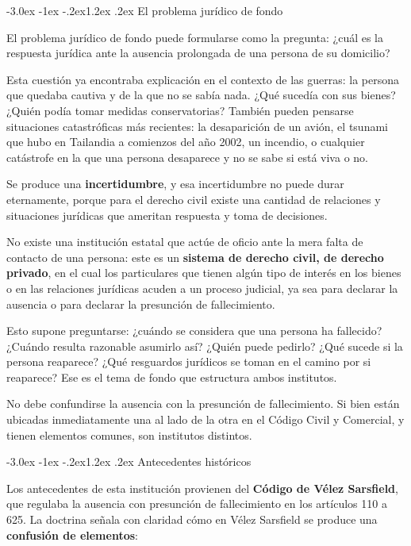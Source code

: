 \documentclass[12pt,oneside]{book}
\makeatletter
\renewcommand\section{\@startsection{section}{1}{\z@}%
  {-3.0ex \@plus -1ex \@minus -.2ex}{1.2ex \@plus .2ex}%
  {\normalfont\large\bfseries\color{acento}}}
\makeatother
\begin{document}
\section{El problema jurídico de fondo}

El problema jurídico de fondo puede formularse como la pregunta: ¿cuál es
la respuesta jurídica ante la ausencia prolongada de una persona de su
domicilio?

Esta cuestión ya encontraba explicación en el contexto de las guerras: la
persona que quedaba cautiva y de la que no se sabía nada. ¿Qué sucedía con
sus bienes? ¿Quién podía tomar medidas conservatorias? También pueden
pensarse situaciones catastróficas más recientes: la desaparición de un
avión, el tsunami que hubo en Tailandia a comienzos del año 2002, un
incendio, o cualquier catástrofe en la que una persona desaparece y no se
sabe si está viva o no.

Se produce una \textbf{incertidumbre}, y esa incertidumbre no puede durar
eternamente, porque para el derecho civil existe una cantidad de
relaciones y situaciones jurídicas que ameritan respuesta y toma de
decisiones.

No existe una institución estatal que actúe de oficio ante la mera falta
de contacto de una persona: este es un \textbf{sistema de derecho civil,
de derecho privado}, en el cual los particulares que tienen algún tipo de
interés en los bienes o en las relaciones jurídicas acuden a un proceso
judicial, ya sea para declarar la ausencia o para declarar la presunción
de fallecimiento.

Esto supone preguntarse: ¿cuándo se considera que una persona ha
fallecido? ¿Cuándo resulta razonable asumirlo así? ¿Quién puede pedirlo?
¿Qué sucede si la persona reaparece? ¿Qué resguardos jurídicos se toman en
el camino por si reaparece? Ese es el tema de fondo que estructura ambos
institutos.

\begin{importante}
No debe confundirse la ausencia con la presunción de fallecimiento. Si
bien están ubicadas inmediatamente una al lado de la otra en el Código
Civil y Comercial, y tienen elementos comunes, son institutos distintos.
\end{importante}

\section{Antecedentes históricos}

Los antecedentes de esta institución provienen del \textbf{Código de
Vélez Sarsfield}, que regulaba la ausencia con presunción de fallecimiento
en los artículos 110 a 625. La doctrina señala con claridad cómo en Vélez
Sarsfield se produce una \textbf{confusión de elementos}:
\end{document}

